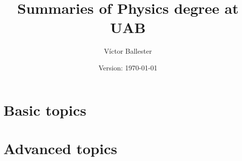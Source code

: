 \documentclass[10pt,a4paper]{report}
\title{Summaries of Physics degree at UAB}
\author{Víctor Ballester}
\date{Version: \today}
\begin{document}
\maketitle
\newpage
\tableofcontents
\newpage

\cleardoublepage
\chapter{Basic topics}
\newpage
%       


\cleardoublepage


\cleardoublepage

%       
%       

%       


\cleardoublepage
\chapter{Advanced topics}
\newpage


\cleardoublepage


\cleardoublepage

\end{document}
